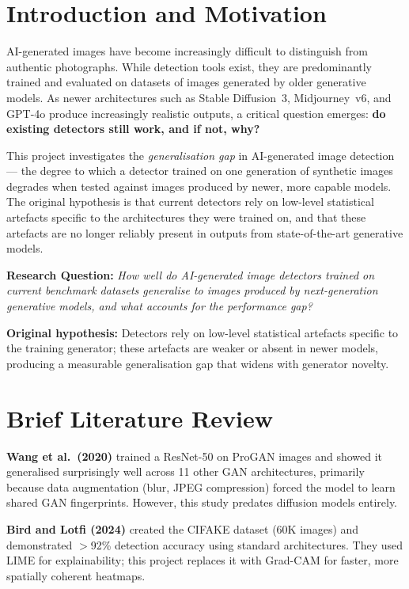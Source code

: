 \documentclass[12pt,a4paper]{article}
\begin{document}
\section{Introduction and Motivation}

AI-generated images have become increasingly difficult to distinguish from authentic photographs. While detection tools exist, they are predominantly trained and evaluated on datasets of images generated by older generative models. As newer architectures such as Stable Diffusion~3, Midjourney~v6, and GPT-4o produce increasingly realistic outputs, a critical question emerges: \textbf{do existing detectors still work, and if not, why?}

This project investigates the \emph{generalisation gap} in AI-generated image detection --- the degree to which a detector trained on one generation of synthetic images degrades when tested against images produced by newer, more capable models. The original hypothesis is that current detectors rely on low-level statistical artefacts specific to the architectures they were trained on, and that these artefacts are no longer reliably present in outputs from state-of-the-art generative models.

\medskip
\noindent\textbf{Research Question:} \emph{How well do AI-generated image detectors trained on current benchmark datasets generalise to images produced by next-generation generative models, and what accounts for the performance gap?}

\medskip
\noindent\textbf{Original hypothesis:} Detectors rely on low-level statistical artefacts specific to the training generator; these artefacts are weaker or absent in newer models, producing a measurable generalisation gap that widens with generator novelty.

\section{Brief Literature Review}

\textbf{Wang et al.\ (2020)} trained a ResNet-50 on ProGAN images and showed it generalised surprisingly well across 11 other GAN architectures, primarily because data augmentation (blur, JPEG compression) forced the model to learn shared GAN fingerprints. However, this study predates diffusion models entirely.

\textbf{Bird and Lotfi (2024)} created the CIFAKE dataset (60K images) and demonstrated $>$92\% detection accuracy using standard architectures. They used LIME for explainability; this project replaces it with Grad-CAM for faster, more spatially coherent heatmaps.
\end{document}
